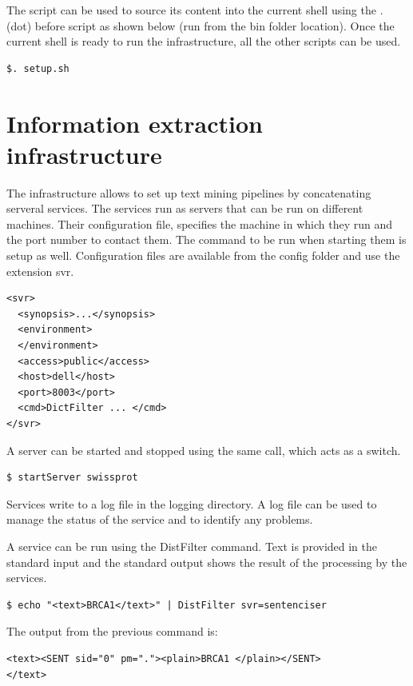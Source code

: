 \documentclass{report}
\begin{document}
The script can be used to source its content into the current shell using the . (dot) before script as shown below (run from the bin folder location).
Once the current shell is ready to run the infrastructure, all the other scripts can be used.

\begin{verbatim}
$. setup.sh
\end{verbatim}

\section{Information extraction infrastructure}

The infrastructure allows to set up text mining pipelines by concatenating serveral services.
The services run as servers that can be run on different machines.
Their configuration file, specifies the machine in which they run and the port number to contact them.
The command to be run when starting them is setup as well.
Configuration files are available from the config folder and use the extension svr.

\begin{verbatim}
<svr>
  <synopsis>...</synopsis>
  <environment>
  </environment>
  <access>public</access>
  <host>dell</host>
  <port>8003</port>
  <cmd>DictFilter ... </cmd>
</svr>
\end{verbatim}

A server can be started and stopped using the same call, which acts as a switch.

\begin{verbatim}
$ startServer swissprot
\end{verbatim}

Services write to a log file in the logging directory.
A log file can be used to manage the status of the service and to identify any problems.


A service can be run using the DistFilter command.
Text is provided in the standard input and the standard output shows the result of the processing by the services.

\begin{verbatim}
$ echo "<text>BRCA1</text>" | DistFilter svr=sentenciser
\end{verbatim}

The output from the previous command is:

\begin{verbatim}
<text><SENT sid="0" pm="."><plain>BRCA1 </plain></SENT>
</text>
\end{verbatim}
\end{document}
